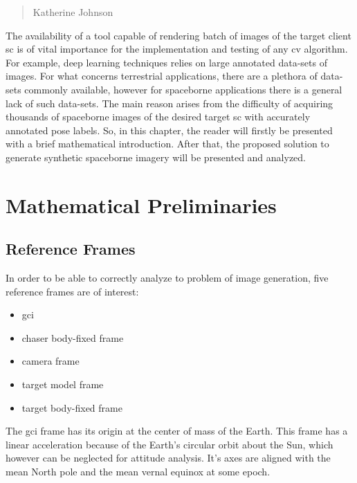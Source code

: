 \begin{quotation}
  {\footnotesize
    \begin{flushright}
      Katherine Johnson
    \end{flushright}
  }
\end{quotation}
\vspace{0.5cm}

The availability of a tool capable of rendering batch of images of the target client \acrshort{sc} is of vital importance for the implementation and testing of any \acrshort{cv} algorithm. For example, deep learning techniques relies on large annotated data-sets of images. For what concerns terrestrial applications, there are a plethora of data-sets commonly available, however for spaceborne applications there is a general lack of such data-sets. The main reason arises from the difficulty of acquiring thousands of spaceborne images of the desired target \acrshort{sc} with accurately annotated pose labels. So, in this chapter, the reader will firstly be presented with a brief mathematical introduction. After that, the proposed solution to generate synthetic spaceborne imagery will be presented and analyzed.

\section{Mathematical Preliminaries}

\subsection{Reference Frames}\label{sec:refereceFrames}
In order to be able to correctly analyze to problem of image generation, five reference frames are of interest:
\begin{itemize}
  \item \acrfull{gci}
  \item chaser body-fixed frame
  \item camera frame
  \item target model frame
  \item target body-fixed frame
\end{itemize}

The \acrshort{gci} frame has its origin at the center of mass of the Earth. This frame has a linear acceleration because of the Earth's circular orbit about the Sun, which however can be neglected for attitude analysis.
It's axes are aligned with the mean North pole and the mean vernal equinox at some epoch.\\


